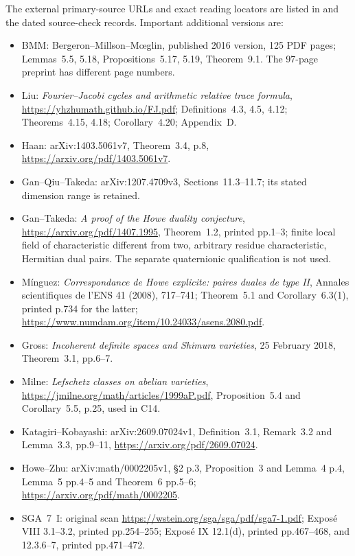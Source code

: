 The external primary-source URLs and exact reading locators are
listed in  and the
dated source-check records. Important additional versions are:
\begin{itemize}[leftmargin=*]
\item BMM: Bergeron--Millson--M\oe glin, published 2016 version,
125 PDF pages; Lemmas~5.5, 5.18, Propositions~5.17, 5.19,
Theorem~9.1. The 97-page preprint has different page numbers.
\item Liu: \emph{Fourier--Jacobi cycles and arithmetic relative
trace formula}, \url{https://yhzhumath.github.io/FJ.pdf};
Definitions~4.3, 4.5, 4.12; Theorems~4.15, 4.18;
Corollary~4.20; Appendix~D.
\item Haan: arXiv:1403.5061v7, Theorem~3.4, p.8,
\url{https://arxiv.org/pdf/1403.5061v7}.
\item Gan--Qiu--Takeda: arXiv:1207.4709v3,
Sections~11.3--11.7; its stated dimension range is retained.
\item Gan--Takeda: \emph{A proof of the Howe duality conjecture},
\url{https://arxiv.org/pdf/1407.1995}, Theorem~1.2,
printed pp.1--3; finite local field of characteristic different
from two, arbitrary residue characteristic, Hermitian dual pairs.
The separate quaternionic qualification is not used.
\item M\'inguez: \emph{Correspondance de Howe explicite:
paires duales de type II}, Annales scientifiques de l'ENS
41 (2008), 717--741; Theorem~5.1 and Corollary~6.3(1),
printed p.734 for the latter;
\url{https://www.numdam.org/item/10.24033/asens.2080.pdf}.
\item Gross: \emph{Incoherent definite spaces and Shimura varieties},
25 February 2018, Theorem~3.1, pp.6--7.
\item Milne: \emph{Lefschetz classes on abelian varieties},
\url{https://jmilne.org/math/articles/1999aP.pdf},
Proposition~5.4 and Corollary~5.5, p.25, used in C14.
\item Katagiri--Kobayashi: arXiv:2609.07024v1,
Definition~3.1, Remark~3.2 and Lemma~3.3, pp.9--11,
\url{https://arxiv.org/pdf/2609.07024}.
\item Howe--Zhu: arXiv:math/0002205v1,
\S2 p.3, Proposition~3 and Lemma~4 p.4,
Lemma~5 pp.4--5 and Theorem~6 pp.5--6;
\url{https://arxiv.org/pdf/math/0002205}.
\item SGA~7~I: original scan
\url{https://wstein.org/sga/sga/pdf/sga7-1.pdf};
Expos\'e VIII 3.1--3.2, printed pp.254--255;
Expos\'e IX 12.1(d), printed pp.467--468, and
12.3.6--7, printed pp.471--472.

\end{itemize}
